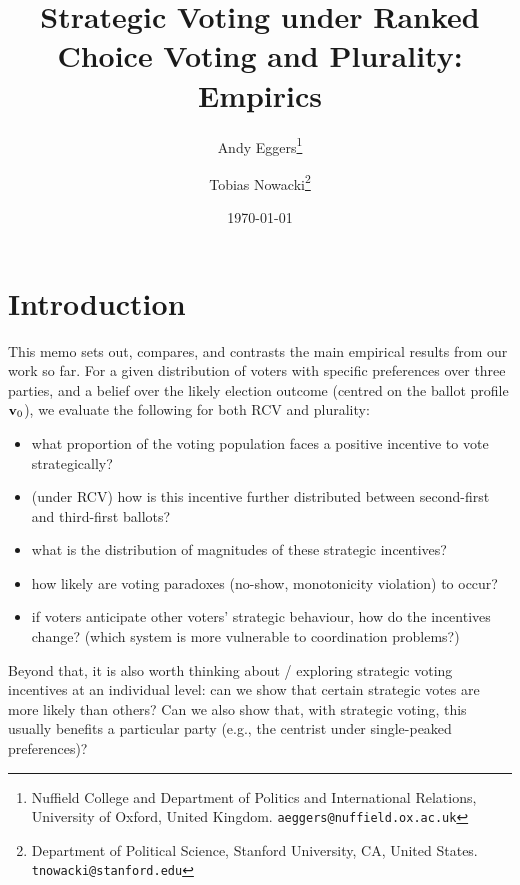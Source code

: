 \documentclass[11pt, letter, margin = 2 in]{article}
\begin{document}
\author{Andy Eggers\thanks{Nuffield College and Department of Politics and International Relations, University of Oxford, United Kingdom. \texttt{aeggers@nuffield.ox.ac.uk}}
\and
Tobias Nowacki\thanks{Department of Political Science, Stanford University, CA, United States. \texttt{tnowacki@stanford.edu}}}
\date{\today}
\title{Strategic Voting under Ranked Choice Voting and Plurality: Empirics}

\maketitle

\section{Introduction}

This memo sets out, compares, and contrasts the main empirical results from our work so far. For a given distribution of voters with specific preferences over three parties, and a belief over the likely election outcome (centred on the ballot profile ${\bf v}_0$), we evaluate the following for both RCV and plurality:
\begin{itemize}
\item what proportion of the voting population faces a positive incentive to vote strategically?
\item (under RCV) how is this incentive further distributed between second-first and third-first ballots?
\item what is the distribution of magnitudes of these strategic incentives?
\item how likely are voting paradoxes (no-show, monotonicity violation) to occur?
\item if voters anticipate other voters' strategic behaviour, how do the incentives change? (which system is more vulnerable to coordination problems?)
\end{itemize}

Beyond that, it is also worth thinking about / exploring strategic voting incentives at an individual level: can we show that certain strategic votes are more likely than others? Can we also show that, with strategic voting, this usually benefits a particular party (e.g., the centrist under single-peaked preferences)?
\end{document}
